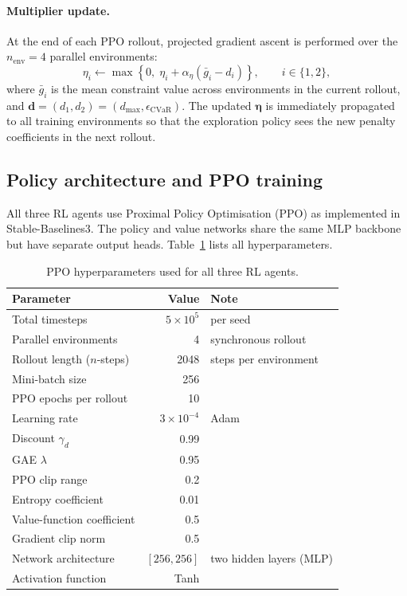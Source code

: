 \documentclass[11pt]{article}
\begin{document}
\paragraph{Multiplier update.}
At the end of each PPO rollout, projected gradient ascent is performed
over the $n_{\text{env}} = 4$ parallel environments:
\begin{equation}
  \eta_i \leftarrow \max\!\left\{0,\;
    \eta_i + \alpha_\eta \left(\bar{g}_i - d_i\right)\right\},
  \qquad i \in \{1, 2\},
  \label{eq:eta_update}
\end{equation}
where $\bar{g}_i$ is the mean constraint value across environments in
the current rollout, and $\mathbf{d} = (d_1, d_2) = (d_{\max}, \epsilon_{\text{CVaR}})$.
The updated $\boldsymbol{\eta}$ is immediately propagated to all
training environments so that the exploration policy sees the new
penalty coefficients in the next rollout.

\subsection{Policy architecture and PPO training}

All three RL agents use Proximal Policy Optimisation (PPO)
\parencite{schulman2017ppo} as implemented in Stable-Baselines3.
The policy and value networks share the same MLP backbone but have
separate output heads.
Table~\ref{tab:ppo_params} lists all hyperparameters.

\begin{table}[H]
\centering
\caption{PPO hyperparameters used for all three RL agents.}
\label{tab:ppo_params}
\begin{tabular}{@{}lrl@{}}
\toprule
Parameter & Value & Note \\
\midrule
Total timesteps           & $5 \times 10^5$ & per seed \\
Parallel environments     & 4 & synchronous rollout \\
Rollout length ($n$-steps)& 2048 & steps per environment \\
Mini-batch size           & 256 & \\
PPO epochs per rollout    & 10 & \\
Learning rate             & $3 \times 10^{-4}$ & Adam \\
Discount $\gamma_d$       & 0.99 & \\
GAE $\lambda$             & 0.95 & \\
PPO clip range            & 0.2 & \\
Entropy coefficient       & 0.01 & \\
Value-function coefficient& 0.5 & \\
Gradient clip norm        & 0.5 & \\
\midrule
Network architecture      & $[256, 256]$ & two hidden layers (MLP) \\
Activation function       & Tanh & \\
\bottomrule
\end{tabular}
\end{table}
\end{document}

